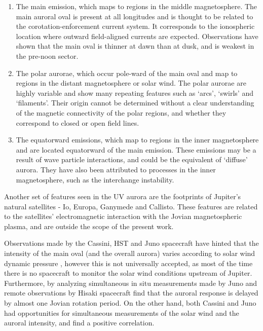 \begin{enumerate}
    \item The main emission, which maps to regions in the middle magnetosphere. The main auroral oval is present at all longitudes and is thought to be related to the corotation-enforcement current system. It corresponds to the ionospheric location where outward field-aligned currents are expected. Observations have shown that the main oval is thinner at dawn than at dusk, and is weakest in the pre-noon sector. 
    \item The polar aurorae, which occur pole-ward of the main oval and map to regions in the distant magnetosphere or solar wind. The polar aurorae are highly variable and show many repeating features such as `arcs', `swirls' and `filaments'. Their origin cannot be determined without a clear understanding of the magnetic connectivity of the polar regions, and whether they correspond to closed or open field lines.
    \item The equatorward emissions, which map to regions in the inner magnetosphere and are located equatorward of the main emission. These emissions may be a result of wave particle interactions, and could be the equivalent of `diffuse' aurora. They have also been attributed to processes in the inner magnetosphere, such as the interchange instability.
\end{enumerate}

Another set of features seen in the UV aurora are the footprints of Jupiter's natural satellites - Io, Europa, Ganymede and Callisto. These features are related to the satellites' electromagnetic interaction with the Jovian magnetospheric plasma, and are outside the scope of the present work. 

Observations made by the Cassini, HST and Juno spacecraft have hinted that the intensity of the main oval (and the overall aurora) varies according to solar wind dynamic pressure \cite{Nichols2007a,Nichols2017a}, however this is not universally accepted, as most of the time there is no spacecraft to monitor the solar wind conditions upstream of Jupiter. Furthermore, by analyzing simultaneous in situ measurements made by Juno and remote observations by Hisaki spacecraft \cite{Kita2016} find that the auroral response is delayed by almost one Jovian rotation period. On the other hand, both Cassini and Juno had opportunities for simultaneous measurements of the solar wind and the auroral intensity, and find a positive correlation. 

